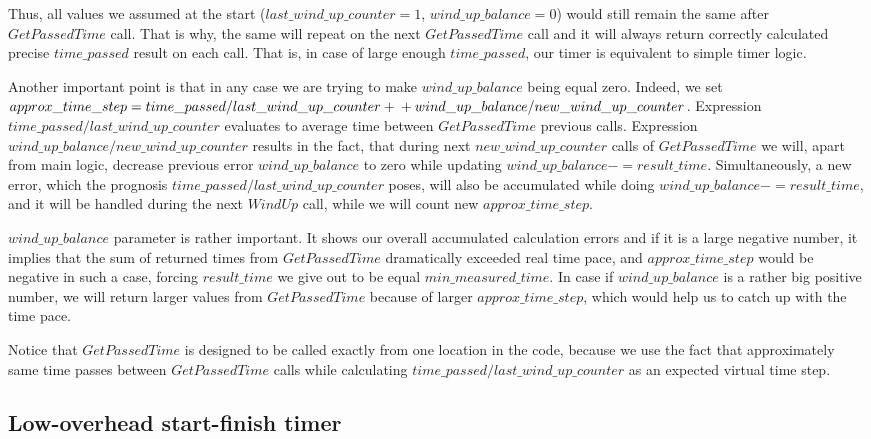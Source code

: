\documentclass{article}
\begin{document}
Thus, all values we assumed at the start ($last\_wind\_up\_counter = 1$, $wind\_up\_balance = 0$) would still remain the same after $GetPassedTime$ call. That is why, the same will repeat on the next $GetPassedTime$ call and it will always return correctly calculated precise $time\_passed$ result on each call. That is, in case of large enough $time\_passed$, our timer is equivalent to simple timer logic.

Another important point is that in any case we are trying to make $wind\_up\_balance$ being equal zero. Indeed, we set $approx\_time\_step = time\_passed / last\_wind\_up\_counter +\\+ wind\_up\_balance / new\_wind\_up\_counter$. Expression $time\_passed / last\_wind\_up\_counter$ evaluates to average time between $GetPassedTime$ previous calls. Expression \\$wind\_up\_balance / new\_wind\_up\_counter$ results in the fact, that during next $new\_wind\_up\_counter$ calls of $GetPassedTime$ we will, apart from main logic, decrease previous error $wind\_up\_balance$ to zero while updating $wind\_up\_balance -= result\_time$. Simultaneously, a new error, which the prognosis $time\_passed / last\_wind\_up\_counter$ poses, will also be accumulated while doing $wind\_up\_balance -= result\_time$, and it will be handled during the next $WindUp$ call, while we will count new $approx\_time\_step$.

$wind\_up\_balance$ parameter is rather important. It shows our overall accumulated calculation errors and if it is a large negative number, it implies that the sum of returned times from $GetPassedTime$ dramatically exceeded real time pace, and $approx\_time\_step$ would be negative in such a case, forcing $result\_time$ we give out to be equal $min\_measured\_time$. In case if $wind\_up\_balance$ is a rather big positive number, we will return larger values from $GetPassedTime$ because of larger $approx\_time\_step$, which would help us to catch up with the time pace.

Notice that $GetPassedTime$ is designed to be called exactly from one location in the code, because we use the fact that approximately same time passes between $GetPassedTime$ calls while calculating $time\_passed / last\_wind\_up\_counter$ as an expected virtual time step.

\subsection{Low-overhead start-finish timer}
\end{document}

